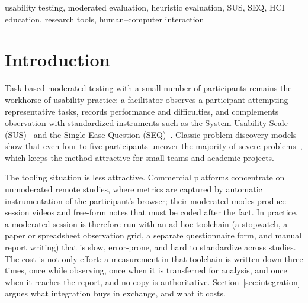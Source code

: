 \documentclass[conference]{IEEEtran}
\begin{document}
\begin{IEEEkeywords}
usability testing, moderated evaluation, heuristic evaluation, SUS, SEQ,
HCI education, research tools, human--computer interaction
\end{IEEEkeywords}

\section{Introduction}
Task-based moderated testing with a small number of participants remains
the workhorse of usability practice: a facilitator observes a participant
attempting representative tasks, records performance and difficulties, and
complements observation with standardized instruments such as the System
Usability Scale (SUS)~\cite{brooke1996sus} and the Single Ease Question
(SEQ)~\cite{sauro2009comparison}. Classic problem-discovery models show
that even four to five participants uncover the majority of severe
problems~\cite{virzi1992refining,nielsen1993mathematical}, which keeps the
method attractive for small teams and academic projects.

The tooling situation is less attractive. Commercial platforms concentrate
on unmoderated remote studies, where metrics are captured by automatic
instrumentation of the participant's browser; their moderated modes
produce session videos and free-form notes that must be coded after the
fact. In practice, a moderated session is therefore run with an ad-hoc
toolchain (a stopwatch, a paper or spreadsheet observation grid, a
separate questionnaire form, and manual report writing) that is slow,
error-prone, and hard to standardize across studies. The cost is not only
effort: a measurement in that toolchain is written down three times, once
while observing, once when it is transferred for analysis, and once when it
reaches the report, and no copy is authoritative.
Section~\ref{sec:integration} argues what integration buys in exchange, and
what it costs.
\end{document}
